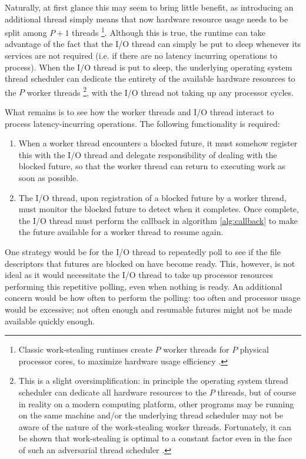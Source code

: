 \documentclass[bsc,frontabs,singlespacing,parskip,deptreport,normalheadings]{infthesis}
\begin{document}
Naturally, at first glance this may seem to bring little benefit, as introducing
an additional thread simply means that now hardware resource usage needs to be
split among \(P + 1\) threads \footnote{Classic work-stealing runtimes create
    \(P\) worker threads for \(P\) physical processor cores, to maximize
hardware usage efficiency \cite{arora_thread_1998}.}. Although this is true, the
runtime can take advantage of the fact that the I/O thread can simply be put to
sleep whenever its services are not required (i.e. if there are no latency
incurring operations to process). When the I/O thread is put to sleep, the
underlying operating system thread scheduler can dedicate the entirety of the
available hardware resources to the \(P\) worker threads \footnote{This is a
    slight oversimplification: in principle the operating system thread
    scheduler can dedicate all hardware resources to the \(P\) threads, but of
    course in reality on a modern computing platform, other programs may be
    running on the same machine and/or the underlying thread scheduler may not
    be aware of the nature of the work-stealing worker threads. Fortunately, it
can be shown that work-stealing is optimal to a constant factor even in the face
of such an adversarial thread scheduler \cite{arora_thread_1998}.}, with the I/O
thread not taking up any processor cycles.

What remains is to see how the worker threads and I/O thread interact to process
latency-incurring operations. The following functionality is required:

\begin{enumerate}
    \item \label{item:register_with_io_thread} When a worker thread encounters a
        blocked future, it must somehow register this with the I/O thread and
        delegate responsibility of dealing with the blocked future, so that the
        worker thread can return to executing work as soon as possible.
    \item \label{item:monitor_future} The I/O thread, upon registration of a
        blocked future by a worker thread, must monitor the blocked future to
        detect when it completes. Once complete, the I/O thread must perform the
        callback in algorithm \ref{alg:callback} to make the future available
        for a worker thread to resume again.
\end{enumerate}

One strategy would be for the I/O thread to repeatedly poll to see if the file
descriptors that futures are blocked on have become ready. This, however, is not
ideal as it would necessitate the I/O thread to take up processor resources
performing this repetitive polling, even when nothing is ready. An additional
concern would be how often to perform the polling: too often and processor usage
would be excessive; not often enough and resumable futures might not be made
available quickly enough.
\end{document}
